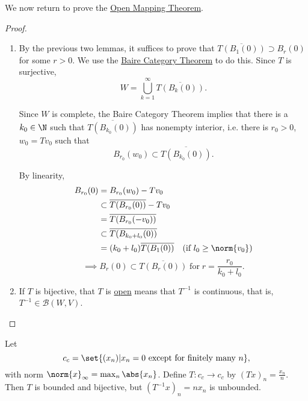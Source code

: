 \documentclass{article}
\begin{document}

We now return to prove the \hyperlink{thm:omt}{Open Mapping Theorem}.
\begin{proof}
    \leavevmode
    \begin{enumerate}[label=(\roman*)]
        \item By the previous two lemmas, it suffices to prove that $\overline{T(B_1(0))} \supset B_r(0)$ for some $r > 0$. We use the \hyperlink{thm:baireCategory}{Baire Category Theorem} to do this. Since $T$ is surjective,
            \begin{equation*}
                W = \bigcup_{k=1}^\infty \overline{T(B_k(0))}.
            \end{equation*}

            Since $W$ is complete, the Baire Category Theorem implies that there is a $k_0 \in \N$ such that $\overline{T(B_{k_0}(0))}$ has nonempty interior, i.e. there is $r_0 > 0$, $w_0 = T v_0$ such that
            \begin{equation*}
                B_{r_0}(w_0) \subset \overline{T(B_{k_0}(0))}.
            \end{equation*}

            By linearity,
            \begin{align*}
                B_{r_0}(0) &= B_{r_0}(w_0) - T v_0 \\
                           &\subset \overline{T(B_{r_0}(0))} - T v_0 \\
                           &= \overline{T(B_{r_0}(-v_0))} \\
                           &\subset \overline{T(B_{k_0 + l_0}(0))} \\
                           &= (k_0 + l_0) \overline{T(B_1(0))} \quad \text{(if $l_0 \geq \norm{v_0}$)}
            \end{align*}
            \begin{equation*}
                \implies B_r(0) \subset \overline{T(B_r(0))} \; \text{for} \; r = \frac{r_0}{k_0 + l_0}.
            \end{equation*}

        \item If $T$ is bijective, that $T$ is \hyperlink{def:openMap}{open} means that $T^{-1}$ is continuous, that is, $T^{-1} \in \mathcal{B}(W, V)$.
    \end{enumerate}
\end{proof}

\begin{eg}
    Let \begin{equation*}c_c = \set{(x_n) | x_n = 0 \text{ except for finitely many } n},\end{equation*} with norm $\norm{x}_\infty = \max_n \abs{x_n}$.
    Define $T: c_c \to c_c$ by $(T x)_n = \frac{x_n}{n}$.
    Then $T$ is bounded and bijective, but $(T^{-1} x)_n = n x_n$ is unbounded.
\end{eg}
\end{document}
